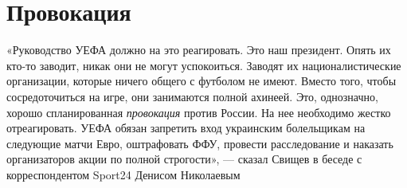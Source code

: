  
 
 
 
 
\chapter{Провокация}
\label{sec:slova.provokacia}

«Руководство УЕФА должно на это реагировать. Это наш президент. Опять их кто-то
заводит, никак они не могут успокоиться. Заводят их националистические
организации, которые ничего общего с футболом не имеют. Вместо того, чтобы
сосредоточиться на игре, они занимаются полной ахинеей.  Это, однозначно,
хорошо спланированная \emph{провокация} против России. На нее необходимо жестко
отреагировать. УЕФА обязан запретить вход украинским болельщикам на следующие
матчи Евро, оштрафовать ФФУ, провести расследование и наказать организаторов
акции по полной строгости», — сказал Свищев в беседе с корреспондентом Sport24
Денисом Николаевым
